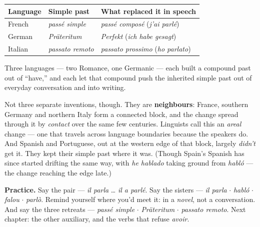 \begin{center}
\begin{tabular}{@{}lll@{}}
\toprule
Language & Simple past & What replaced it in speech \\
\midrule
French & \emph{pass\'{e} simple} & \emph{pass\'{e} compos\'{e}} (\emph{j'ai parl\'{e}}) \\
German & \emph{Pr\"{a}teritum} & \emph{Perfekt} (\emph{ich habe gesagt}) \\
Italian & \emph{passato remoto} & \emph{passato prossimo} (\emph{ho parlato}) \\
\bottomrule
\end{tabular}
\end{center}

Three languages --- two Romance, one Germanic --- each built a compound past out
of ``have,'' and each let that compound push the inherited simple past out of
everyday conversation and into writing.

\begin{culture}
Not three separate inventions, though. They are \textbf{neighbours}: France,
southern Germany and northern Italy form a connected block, and the change
spread through it by \emph{contact} over the same few centuries. Linguists call
this an \emph{areal} change --- one that travels across language boundaries
because the speakers do.\\[3pt]
And Spanish and Portuguese, out at the western edge of that block, largely
\emph{didn't} get it. They kept their simple past where it was. (Though Spain's
Spanish has since started drifting the same way, with \emph{he hablado} taking
ground from \emph{habl\'{o}} --- the change reaching the edge late.)
\end{culture}

\begin{sounds}
\textbf{Practice.} Say the pair --- \emph{il parla} \ldots{} \emph{il a
parl\'{e}}. Say the sisters --- \emph{il parla} $\cdot$ \emph{habl\'{o}}
$\cdot$ \emph{falou} $\cdot$ \emph{parl\`{o}}. Remind yourself where you'd meet
it: in a \emph{novel}, not a conversation. And say the three retreats ---
\emph{pass\'{e} simple} $\cdot$ \emph{Pr\"{a}teritum} $\cdot$ \emph{passato
remoto}. Next chapter: the other auxiliary, and the verbs that refuse
\emph{avoir}.
\end{sounds}
